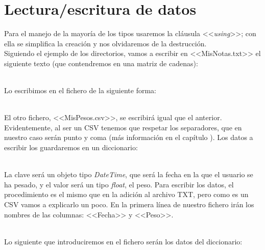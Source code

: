 \documentclass[11pt, oneside]{book}		%
\begin{document}
	\section{Lectura/escritura de datos}
	Para el manejo de la mayoría de los tipos usaremos la cláusula <<\textit{using}>>; con ella se simplifica la creación y nos olvidaremos de la destrucción.\\
	Siguiendo el ejemplo de los directorios, vamos a escribir en <<MisNotas.txt>> el siguiente texto (que contendremos en una matriz de cadenas):
	\\\\\begin{minipage}[c]{0.95\textwidth}
		
	\end{minipage}
	Lo escribimos en el fichero de la siguiente forma:
	\\\\\begin{minipage}[c]{0.95\textwidth}
		
	\end{minipage}
	El otro fichero, <<MisPesos.csv>>, se escribirá igual que el anterior. Evidentemente, al ser un CSV tenemos que respetar los separadores, que en nuestro caso serán punto y coma (más información en el capítulo ). Los datos a escribir los guardaremos en un diccionario:
	\\\\\begin{minipage}[c]{0.95\textwidth}
		
	\end{minipage}
	La clave será un objeto tipo \textit{DateTime}, que será la fecha en la que el usuario se ha pesado, y el valor será un tipo \textit{float}, el peso. Para escribir los datos, el procedimiento es el mismo que en la adición al archivo TXT, pero como es un CSV vamos a explicarlo un poco. En la primera línea de nuestro fichero irán los nombres de las columnas: <<Fecha>> y <<Peso>>. 
	\\\\\begin{minipage}[c]{0.95\textwidth}
		
	\end{minipage}
	Lo siguiente que introduciremos en el fichero serán los datos del diccionario:
\end{document}
